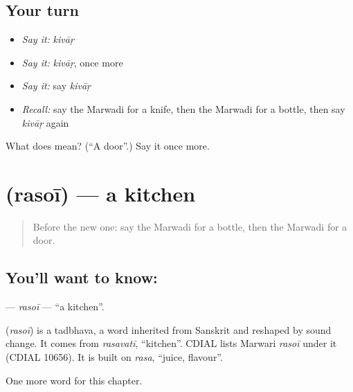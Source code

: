 \subsection*{Your turn}
\begin{itemize}
\raggedright
  \item \emph{Say it:} \emph{kivāṛ}
  \item \emph{Say it:} \emph{kivāṛ}, once more
  \item \emph{Say it:} say \emph{kivāṛ}
  \item \emph{Recall:} say the Marwadi for a knife, then the Marwadi for a bottle, then say \emph{kivāṛ} again
\end{itemize}

\begin{tcolorbox}[breakable,colback=teal!4,colframe=teal!35!black,title={Before you move on}]
What does  mean? (\textquotedblleft{}A door\textquotedblright{}.) Say it once more.
\end{tcolorbox}
\section[\texorpdfstring{\mw{रसोई} (rasoī)}{रसोई (rasoī)}]{ (rasoī) — a kitchen}

\label{lesson:MW-C65-rasoi}



\begin{quote}
Before the new one: say the Marwadi for a bottle, then the Marwadi for a door.
\end{quote}

\subsection*{You'll want to know: }
\textbf{} — \emph{rasoī} — \textquotedblleft{}a kitchen\textquotedblright{}.

\begin{cousinweb}
\textbf{} (\emph{rasoī}) is a tadbhava, a word inherited from Sanskrit and reshaped by sound change. It comes from \emph{rasavatī}, \textquotedblleft{}kitchen\textquotedblright{}. CDIAL lists Marwari \emph{rasoī} under it (CDIAL 10656). It is built on \emph{rasa}, \textquotedblleft{}juice, flavour\textquotedblright{}.
\end{cousinweb}

\begin{grammarlens}[title={What you've built}]
One more word for this chapter.
\end{grammarlens}

